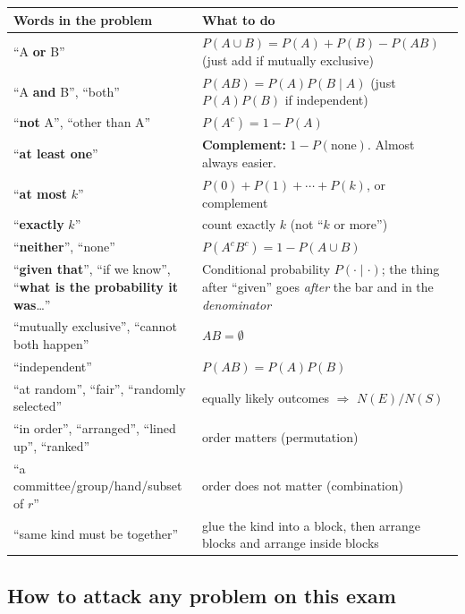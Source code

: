 \documentclass[11pt]{article}
\let\oldsubsection\subsection
\renewcommand{\subsection}{\Needspace{14\baselineskip}\oldsubsection}
\begin{document}
\begin{center}
\renewcommand{\arraystretch}{1.25}
\begin{tabular}{@{}>{\raggedright\arraybackslash}p{2.3in}>{\raggedright\arraybackslash}p{3.9in}@{}}
\toprule
\textbf{Words in the problem} & \textbf{What to do}\\
\midrule
``A \textbf{or} B'' & $P(A\cup B)=P(A)+P(B)-P(AB)$ (just add if mutually exclusive)\\
``A \textbf{and} B'', ``both'' & $P(AB)=P(A)P(B\mid A)$ (just $P(A)P(B)$ if independent)\\
``\textbf{not} A'', ``other than A'' & $P(A^c)=1-P(A)$\\
``\textbf{at least one}'' & \textbf{Complement:} $1-P(\text{none})$. Almost always easier.\\
``\textbf{at most} $k$'' & $P(0)+P(1)+\cdots+P(k)$, or complement\\
``\textbf{exactly} $k$'' & count exactly $k$ (not ``$k$ or more'')\\
``\textbf{neither}'', ``none'' & $P(A^cB^c)=1-P(A\cup B)$\\
``\textbf{given that}'', ``if we know'', ``\textbf{what is the probability it was}\dots'' & Conditional probability $P(\cdot\mid\cdot)$; the thing after ``given'' goes \emph{after} the bar and in the \emph{denominator}\\
``mutually exclusive'', ``cannot both happen'' & $AB=\emptyset$\\
``independent'' & $P(AB)=P(A)P(B)$\\
``at random'', ``fair'', ``randomly selected'' & equally likely outcomes $\Rightarrow$ $N(E)/N(S)$\\
``in order'', ``arranged'', ``lined up'', ``ranked'' & order matters (permutation)\\
``a committee/group/hand/subset of $r$'' & order does not matter (combination)\\
``same kind must be together'' & glue the kind into a block, then arrange blocks and arrange inside blocks\\
\bottomrule
\end{tabular}
\end{center}

\subsection{How to attack any problem on this exam}
\end{document}
